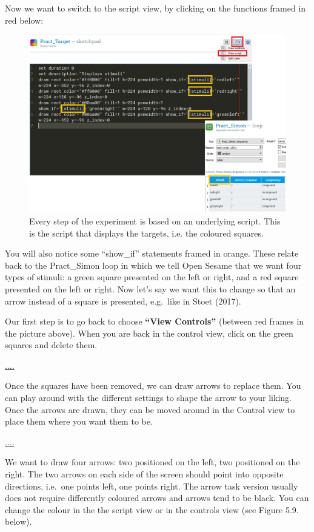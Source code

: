\documentclass[
]{book}
\begin{document}
Now we want to switch to the script view, by clicking on the functions framed in red below:

\begin{figure}

{\centering \includegraphics[width=0.99\linewidth]{images/changesimon/02Script} 

}

\caption{Every step of the experiment is based on an underlying script. This is the script that displays the targets, i.e. the coloured squares.}\label{fig:Figure2-6}
\end{figure}

You will also notice some ``show\_if'' statements framed in orange. These relate back to the Pract\_Simon loop in which we tell Open Sesame that we want four types of stimuli: a green square presented on the left or right, and a red square presented on the left or right. Now let's say we want this to change so that an arrow instead of a square is presented, e.g.~like in Stoet (2017).

Our first step is to go back to choose \textbf{``View Controls''} (between red frames in the picture above). When you are back in the control view, click on the green squares and delete them.

\url{....}

Once the squares have been removed, we can draw arrows to replace them. You can play around with the different settings to shape the arrow to your liking. Once the arrows are drawn, they can be moved around in the Control view to place them where you want them to be.

\url{....}

We want to draw four arrows: two positioned on the left, two positioned on the right. The two arrows on each side of the screen should point into opposite directions, i.e.~one points left, one points right. The arrow task version usually does not require differently coloured arrows and arrows tend to be black. You can change the colour in the the script view or in the controls view (see Figure 5.9. below).
\end{document}
